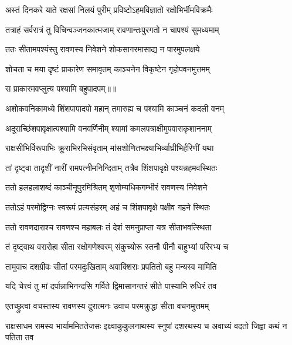 \twolineshloka
{अस्तं दिनकरे याते रक्षसां निलयं पुरीम्}
{प्रविष्टोऽहमविज्ञातो रक्षोभिर्भीमविक्रमैः} %

\twolineshloka
{तत्राहं सर्वरात्रं तु विचिन्वञ्जनकात्मजाम्}
{रावणान्तःपुरगतो न चापश्यं सुमध्यमाम्} %

\twolineshloka
{ततः सीतामपश्यंस्तु रावणस्य निवेशने}
{शोकसागरमासाद्य न पारमुपलक्षये} %

\twolineshloka
{शोचता च मया दृष्टं प्राकारेण समावृतम्}
{काञ्चनेन विकृष्टेन गृहोपवनमुत्तमम्} %

{स प्राकारमवप्लुत्य पश्यामि बहुपादपम्॥॥} %

\addtocounter{shlokacount}{1}

\twolineshloka
{अशोकवनिकामध्ये शिंशपापादपो महान्}
{तमारुह्य च पश्यामि काञ्चनं कदली वनम्} %

\twolineshloka
{अदूराच्छिंशपावृक्षात्पश्यामि वनवर्णिनीम्}
{श्यामां कमलपत्राक्षीमुपवासकृशाननाम्} %

\twolineshloka
{राक्षसीभिर्विरूपाभिः क्रूराभिरभिसंवृताम्}
{मांसशोणितभक्ष्याभिर्व्याघ्रीभिर्हरिणीं यथा} %

\twolineshloka
{तां दृष्ट्वा तादृशीं नारीं रामपत्नीमनिन्दिताम्}
{तत्रैव शिंशपावृक्षे पश्यन्नहमवस्थितः} %

\twolineshloka
{ततो हलहलाशब्दं काञ्चीनूपुरमिश्रितम्}
{शृणोम्यधिकगम्भीरं रावणस्य निवेशने} %

\twolineshloka
{ततोऽहं परमोद्विग्नः स्वरूपं प्रत्यसंहरम्}
{अहं च शिंशपावृक्षे पक्षीव गहने स्थितः} %

\twolineshloka
{ततो रावणदाराश्च रावणश्च महाबलः}
{तं देशं समनुप्राप्ता यत्र सीताभवत्स्थिता} %

\twolineshloka
{तं दृष्ट्वाथ वरारोहा सीता रक्षोगणेश्वरम्}
{संकुच्योरू स्तनौ पीनौ बाहुभ्यां परिरभ्य च} %

\twolineshloka
{तामुवाच दशग्रीवः सीतां परमदुःखिताम्}
{अवाक्शिराः प्रपतितो बहु मन्यस्व मामिति} %

\twolineshloka
{यदि चेत्त्वं तु मां दर्पान्नाभिनन्दसि गर्विते}
{द्विमासानन्तरं सीते पास्यामि रुधिरं तव} %

\twolineshloka
{एतच्छ्रुत्वा वचस्तस्य रावणस्य दुरात्मनः}
{उवाच परमक्रुद्धा सीता वचनमुत्तमम्} %

\threelineshloka
{राक्षसाधम रामस्य भार्याममिततेजसः}
{इक्ष्वाकुकुलनाथस्य स्नुषां दशरथस्य च}
{अवाच्यं वदतो जिह्वा कथं न पतिता तव} %

